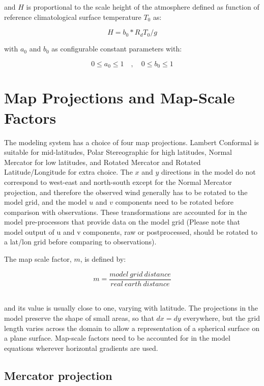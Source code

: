 and $H$ is proportional to the scale height of the atmosphere defined as
function of reference climatological surface temperature $T_0$ as:

\begin{equation}
H = b_0 * R_d T_0 / g
\end{equation}

with $a_0$ and $b_0$ as configurable constant parameters with:

\begin{equation}
0 \le a_0 \le 1 \quad , \quad 0 \le b_0 \le 1
\end{equation}

\section{Map Projections and Map-Scale Factors}
The modeling system has a
choice of four map projections. Lambert Conformal is suitable for mid-latitudes,
Polar Stereographic for high latitudes, Normal Mercator for low latitudes, and
Rotated Mercator and Rotated Latitude/Longitude for extra choice.
The $x$ and $y$ directions in the model do
not correspond to west-east and north-south except for the Normal Mercator
projection, and therefore the observed wind generally has to be rotated to the
model grid, and the model $u$ and $v$ components need to be rotated before
comparison with observations. These transformations are accounted for in the
model pre-processors that provide data on the model grid (Please note that
model output of u and v components, raw or postprocessed, should be rotated to a
lat/lon grid before comparing to observations).

The map scale factor, $m$, is defined by:

\begin{equation}
  m = \frac{model\:grid\:distance}{real\:earth\:distance}
\end{equation}

\noindent \\ and its value is usually close to one, varying with latitude. The
projections in the model preserve the shape of small areas, so that $dx=dy$
everywhere, but the grid length varies across the domain to allow a
representation of a spherical surface on a plane surface.
Map-scale factors need to be accounted for in the model equations wherever
horizontal gradients are used.

\subsection{Mercator projection}

